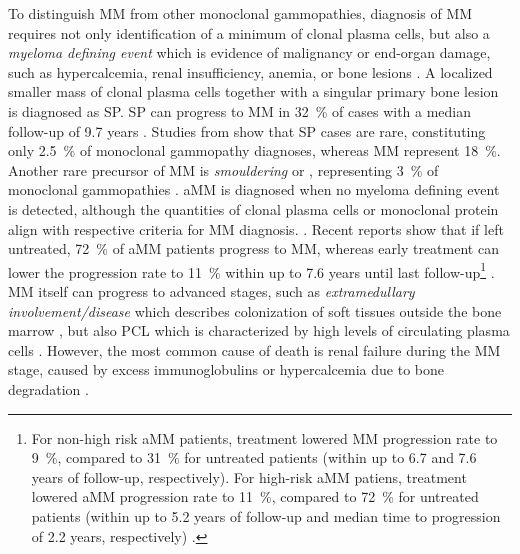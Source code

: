 To distinguish \ac{MM} from other monoclonal gammopathies, diagnosis of \ac{MM}
requires not only identification of a minimum of clonal plasma cells, but also a
\emph{myeloma defining event} which is evidence of malignancy or end-organ
damage, such as hypercalcemia, renal insufficiency, anemia, or bone lesions
\cite{rajkumarInternationalMyelomaWorking2014}. A localized
smaller mass of clonal plasma
cells together with a singular primary bone lesion is diagnosed as \ac{SP}.
\ac{SP} can progress to \ac{MM} in \SI{32}{\percent} of cases with a median
follow-up of 9.7 years
\cite{thumallapallySolitaryPlasmacytomaPopulationbased2017,
    gaoSolitaryBonePlasmacytoma2024}. Studies from
\citet{kyleMonoclonalGammopathyUndetermined1997} show that \ac{SP} cases are
rare, constituting only \SI{2.5}{\percent} of monoclonal gammopathy diagnoses,
whereas \ac{MM} represent \SI{18}{\percent}. Another rare precursor of \ac{MM}
is \textit{smouldering} or , representing \SI{3}{\percent} of
monoclonal gammopathies \cite{kyleMonoclonalGammopathyUndetermined1997}.
\ac{aMM} is diagnosed when no myeloma defining event is detected, although the
quantities of clonal plasma cells or monoclonal protein align with respective
criteria for \ac{MM} diagnosis. \cite{rajkumarInternationalMyelomaWorking2014}.
Recent reports show that if left untreated, \SI{72}{\percent} of \ac{aMM}
patients progress to \ac{MM}, whereas early treatment can lower the progression
rate to \SI{11}{\percent} within up to 7.6 years until last
follow-up\footnote{For non-high risk \ac{aMM} patients, treatment lowered
    \ac{MM} progression rate to \SI{9}{\percent}, compared to \SI{31}{\percent} for
    untreated patients (within up to 6.7 and 7.6 years of follow-up, respectively).
    For high-risk \ac{aMM} patiens, treatment lowered \ac{aMM} progression rate to
    \SI{11}{\percent}, compared to \SI{72}{\percent} for untreated patients (within
    up to 5.2 years of follow-up and median time to progression of 2.2 years,
    respectively) \cite{abdallahModeProgressionSmoldering2024}.}
\cite{abdallahModeProgressionSmoldering2024,
    mateosmaria-victoriaLenalidomideDexamethasoneHighRisk2013}. \ac{MM} itself can
progress to advanced stages, such as \emph{extramedullary involvement/disease}
which describes colonization of soft tissues outside the bone marrow
\cite{bladeExtramedullaryDiseaseMultiple2022}, but also \ac{PCL} which is
characterized by high levels of circulating plasma cells
\cite{jungUpdatePrimaryPlasma2022}. However, the most common cause of death is
renal failure during the \ac{MM} stage, caused by excess immunoglobulins or
hypercalcemia due to bone degradation \cite{kunduMultipleMyelomaRenal2022}.

